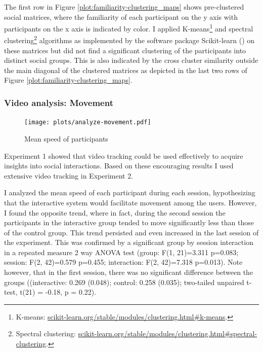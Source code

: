 \documentclass[a4paper,11pt]{article}
\begin{document}
{The first row in Figure \ref{plot:familiarity-clustering_maps} shows pre-clustered social matrices, where the familiarity of each participant on the y axis with participants on the x axis is indicated by color.
I applied K-means\footnote{K-means: \href{http://scikit-learn.org/stable/modules/clustering.html\#k-means}{scikit-learn.org/stable/modules/clustering.html\#k-means}.} and spectral clustering\footnote{Spectral clustering: \href{http://scikit-learn.org/stable/modules/clustering.html\#spectral-clustering}{scikit-learn.org/stable/modules/clustering.html\#spectral-clustering}.} algorithms as implemented by the software package Scikit-learn (\cite{scikit-learn}) on these matrices but did not find a significant clustering of the participants into distinct social groups.
This is also indicated by the cross cluster similarity outside the main diagonal of the clustered matrices as depicted in the last two rows of Figure \ref{plot:familiarity-clustering_maps}.

\subsubsection{Video analysis: Movement}

\begin{figure}[!htb]
    \centering
    \texttt{[image: plots/analyze-movement.pdf]}
    \caption{Mean speed of participants}\label{plot:analyze-movement}
\end{figure}

Experiment 1 showed that video tracking could be used effectively to acquire insights into social interactions.
Based on these encouraging results I used extensive video tracking in Experiment 2.

I analyzed the mean speed of each participant during each session, hypothesizing that the interactive system would facilitate movement among the users.
However, I found the opposite trend, where in fact, during the second session the participants in the interactive group tended to move significantly less than those of the control group.
This trend persisted and even increased in the last session of the experiment.
This was confirmed by a significant group by session interaction in a repeated measure 2 way ANOVA test (group: F(1, 21)=3.311 p=0.083; session: F(2, 42)=0.579 p=0.455; interaction: F(2, 42)=7.318 p=0.013).
Note however, that in the first session, there was no significant difference between the groups ((interactive: 0.269 (0.048); control: 0.258 (0.035); two-tailed unpaired t-test, t(21) = -0.18, p = 0.22).

}
\end{document}
